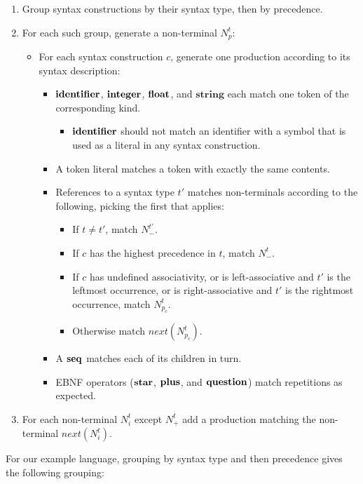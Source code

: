 \documentclass{kththesis}
\begin{document}
\begin{enumerate}
  \item Group syntax constructions by their syntax type, then by precedence.
  \item For each such group, generate a non-terminal $N^t_p$:
  \begin{itemize}
    \item For each syntax construction $c$, generate one production according to its syntax description:
    \begin{itemize}
      \item $\mathrel{\mathbf{identifier}}$, $\mathrel{\mathbf{integer}}$, $\mathrel{\mathbf{float}}$, and $\mathbf{string}$ each match one token of the corresponding kind.
      \begin{itemize}
        \item $\mathrel{\mathbf{identifier}}$ should not match an identifier with a symbol that is used as a literal in any syntax construction.
      \end{itemize}
      \item A token literal matches a token with exactly the same contents.
      \item References to a syntax type $t'$ matches non-terminals according to the following, picking the first that applies:
      \begin{itemize}
        \item If $t \neq t'$, match $N^{t'}_-$.
        \item If $c$ has the highest precedence in $t$, match $N^t_-$.
        \item If $c$ has undefined associativity, or is left-associative and $t'$ is the leftmost occurrence, or is right-associative and $t'$ is the rightmost occurrence, match $N^t_{p_c}$.
        \item Otherwise match $next(N^t_{p_c})$.
      \end{itemize}
      \item A $\mathrel{\mathbf{seq}}$ matches each of its children in turn.
      \item EBNF operators ($\mathrel{\mathbf{star}}$, $\mathrel{\mathbf{plus}}$, and $\mathrel{\mathbf{question}}$) match repetitions as expected.
    \end{itemize}
  \end{itemize}
  \item For each non-terminal $N^t_i$ except $N^t_+$ add a production matching the non-terminal $next(N^t_i)$.
\end{enumerate}
\mathligson

For our example language, grouping by syntax type and then precedence gives the following grouping:
\end{document}

